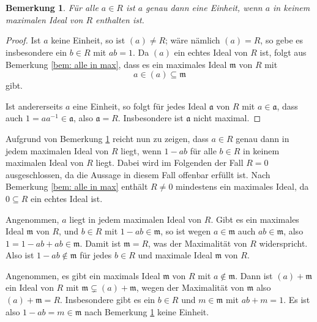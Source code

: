 \documentclass[a4paper,10pt]{article}
\newcounter{satze}
\newtheorem{bem}[satze]{Bemerkung}
\newcommand{\mf}[1]{\mathfrak{#1}}
\begin{document}
\section{}\label{sec: alternative definition J(R)}

\begin{bem}\label{bem: einheiten und maximale ideale}
 Für alle $a \in R$ ist $a$ genau dann eine Einheit, wenn $a$ in keinem maximalen Ideal von $R$ enthalten ist.
\end{bem}
\begin{proof}
 Ist $a$ keine Einheit, so ist $(a) \neq R$; wäre nämlich $(a) = R$, so gebe es insbesondere ein $b \in R$ mit $ab=1$. Da $(a)$ ein echtes Ideal von $R$ ist, folgt aus Bemerkung \ref{bem: alle in max}, dass es ein maximales Ideal $\mf{m}$ von $R$ mit
 \[
  a \in (a) \subseteq \mf{m}
 \]
 gibt.

 Ist andererseits $a$ eine Einheit, so folgt für jedes Ideal $\mf{a}$ von $R$ mit $a \in \mf{a}$, dass auch $1 = aa^{-1} \in \mf{a}$, also $\mf{a} = R$. Insbesondere ist $\mf{a}$ nicht maximal.
\end{proof}

Aufgrund von Bemerkung \ref{bem: einheiten und maximale ideale} reicht nun zu zeigen, dass $a \in R$ genau dann in jedem maximalen Ideal von $R$ liegt, wenn $1-ab$ für alle $b \in R$ in keinem maximalen Ideal von $R$ liegt. Dabei wird im Folgenden der Fall $R=0$ ausgeschlossen, da die Aussage in diesem Fall offenbar erfüllt ist. Nach Bemerkung \ref{bem: alle in max} enthält $R \neq 0$ mindestens ein maximales Ideal, da $0 \subseteq R$ ein echtes Ideal ist.

Angenommen, $a$ liegt in jedem maximalen Ideal von $R$. Gibt es ein maximales Ideal $\mf{m}$ von $R$, und $b \in R$ mit $1-ab \in \mf{m}$, so ist wegen $a \in \mf{m}$ auch $ab \in \mf{m}$, also $1 = 1-ab + ab \in \mf{m}$. Damit ist $\mf{m} = R$, was der Maximalität von $R$ widerspricht. Also ist $1-ab \not\in \mf{m}$ für jedes $b \in R$ und maximale Ideal $\mf{m}$ von $R$.

Angenommen, es gibt ein maximals Ideal $\mf{m}$ von $R$ mit $a \not\in \mf{m}$. Dann ist $(a) + \mf{m}$ ein Ideal von $R$ mit $\mf{m} \subsetneq (a) + \mf{m}$, wegen der Maximalität von $\mf{m}$ also $(a) + \mf{m} = R$. Insbesondere gibt es ein $b \in R$ und $m \in \mf{m}$ mit $ab+m = 1$. Es ist also $1-ab = m \in \mf{m}$ nach Bemerkung \ref{bem: einheiten und maximale ideale} keine Einheit.
\end{document}
